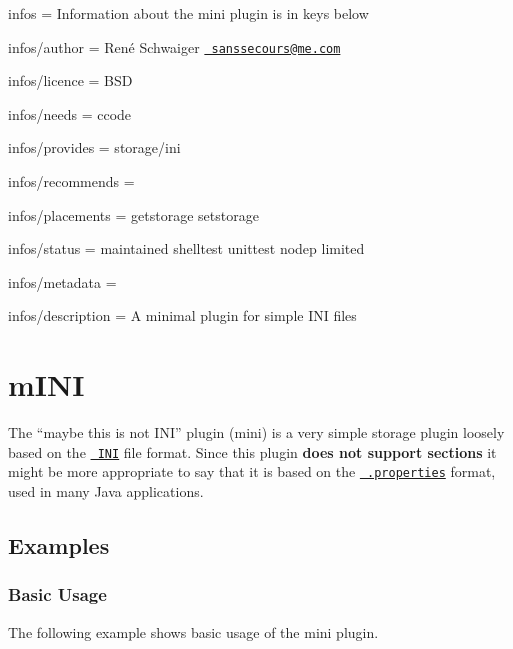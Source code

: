 
\begin{DoxyItemize}
\item infos = Information about the mini plugin is in keys below
\item infos/author = René Schwaiger \href{mailto:sanssecours@me.com}{\texttt{ sanssecours@me.\+com}}
\item infos/licence = B\+SD
\item infos/needs = ccode
\item infos/provides = storage/ini
\item infos/recommends =
\item infos/placements = getstorage setstorage
\item infos/status = maintained shelltest unittest nodep limited
\item infos/metadata =
\item infos/description = A minimal plugin for simple I\+NI files
\end{DoxyItemize}\hypertarget{autotoc_md402_src_plugins_mini_README_md}{}\section{m\+I\+NI}\label{autotoc_md402_src_plugins_mini_README_md}
The “maybe this is not I\+N\+I” plugin ({\ttfamily mini}) is a very simple storage plugin loosely based on the \href{https://en.wikipedia.org/wiki/INI_file}{\texttt{ I\+NI}} file format. Since this plugin {\bfseries{does not support sections}} it might be more appropriate to say that it is based on the \href{https://en.wikipedia.org/wiki/.properties}{\texttt{ .properties}} format, used in many Java applications.\hypertarget{autotoc_md402_autotoc_md403}{}\subsection{Examples}\label{autotoc_md402_autotoc_md403}
\hypertarget{autotoc_md402_autotoc_md404}{}\subsubsection{Basic Usage}\label{autotoc_md402_autotoc_md404}
The following example shows basic usage of the {\ttfamily mini} plugin.

